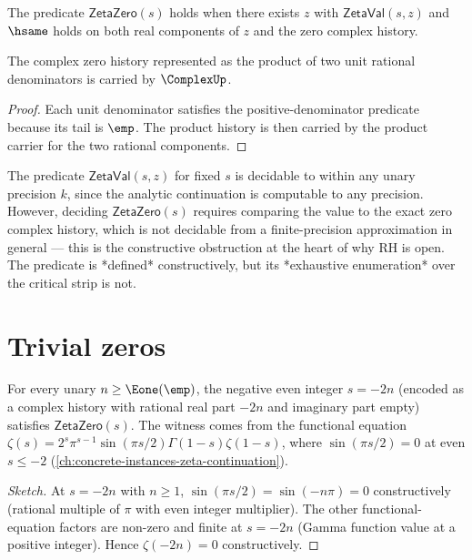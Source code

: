 \begin{definition}
\label{def:zeta-zero}
The predicate \(\mathsf{ZetaZero}(s)\) holds when there exists \(z\) with \(\mathsf{ZetaVal}(s, z)\) and \(\hsame\) holds on both real components of \(z\) and the zero complex history.
\end{definition}

\begin{theorem}
\label{thm:zeta-zero-complex-history-carrier}
The complex zero history represented as the product of two unit rational denominators is carried by \(\ComplexUp\).
\end{theorem}
\begin{proof}
Each unit denominator satisfies the positive-denominator predicate because its tail is \(\emp\). The product history is then carried by the product carrier for the two rational components.
\end{proof}

\begin{remark}
\label{rem:zero-decidability-gap}
The predicate \(\mathsf{ZetaVal}(s, z)\) for fixed \(s\) is decidable to within any unary precision \(k\), since the analytic continuation is computable to any precision. However, deciding \(\mathsf{ZetaZero}(s)\) requires comparing the value to the exact zero complex history, which is not decidable from a finite-precision approximation in general --- this is the constructive obstruction at the heart of why RH is open. The predicate is *defined* constructively, but its *exhaustive enumeration* over the critical strip is not.
\end{remark}

\section{Trivial zeros}

\begin{theorem}
\label{thm:trivial-zero-witness}
For every unary \(n \geq \Eone(\emp)\), the negative even integer \(s = -2n\) (encoded as a complex history with rational real part \(-2n\) and imaginary part empty) satisfies \(\mathsf{ZetaZero}(s)\). The witness comes from the functional equation \(\zeta(s) = 2^s \pi^{s-1} \sin(\pi s / 2) \Gamma(1 - s) \zeta(1 - s)\), where \(\sin(\pi s / 2) = 0\) at even \(s \leq -2\) (\autoref{ch:concrete-instances-zeta-continuation}).
\end{theorem}
\begin{proof}[Sketch]
At \(s = -2n\) with \(n \geq 1\), \(\sin(\pi s / 2) = \sin(-n \pi) = 0\) constructively (rational multiple of \(\pi\) with even integer multiplier). The other functional-equation factors are non-zero and finite at \(s = -2n\) (Gamma function value at a positive integer). Hence \(\zeta(-2n) = 0\) constructively.
\end{proof}

